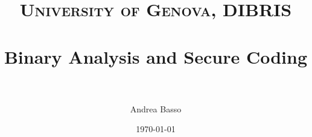 \documentclass[paper=a4, fontsize=11pt]{report} %
\title{	
\normalfont \normalsize 
\textsc{University of Genova, DIBRIS} \\ [25pt]
\horrule{0.5pt} \\[0.4cm] %
\huge Binary Analysis and Secure Coding \\
\horrule{2pt} \\[0.5cm] %
}
\author{Andrea Basso} %
\date{\normalsize\today} %
\numberwithin{equation}{section} %
\numberwithin{figure}{section} %
\numberwithin{table}{section} %
\begin{document}
\maketitle %
\tableofcontents


\glsaddall
\printglossaries
\end{document}
